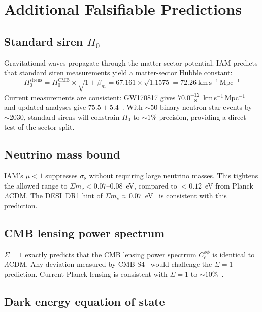 \documentclass[12pt,a4paper]{article}
\begin{document}
\section{Additional Falsifiable Predictions}

\subsection{Standard siren $H_0$}

Gravitational waves propagate through the matter-sector potential. IAM predicts
that standard siren measurements yield a matter-sector Hubble constant:
\begin{equation}
H_0^\mathrm{sirens} = H_0^\mathrm{CMB} \times \sqrt{1 + \beta_m}
= 67.161 \times \sqrt{1.1575} = 72.26\ \mathrm{km\,s^{-1}\,Mpc^{-1}}
\end{equation}
Current measurements are consistent: GW170817 gives $70.0^{+12}_{-8}$~km\,s$^{-1}$\,Mpc$^{-1}$~\citep{Abbott2017} and updated analyses give $75.5 \pm 5.4$~\citep{Nicolaou2023}. With $\sim 50$ binary neutron star events by $\sim 2030$, standard sirens will constrain $H_0$ to $\sim 1\%$ precision, providing a direct test of the sector split.

\subsection{Neutrino mass bound}

IAM's $\mu < 1$ suppresses $\sigma_8$ without requiring large neutrino masses.
This tightens the allowed range to $\Sigma m_\nu < 0.07$--$0.08$~eV, compared
to $< 0.12$~eV from Planck $\Lambda$CDM. The DESI~DR1 hint of
$\Sigma m_\nu \approx 0.07$~eV~\citep{DESI2025} is consistent with this
prediction.

\subsection{CMB lensing power spectrum}

$\Sigma = 1$ exactly predicts that the CMB lensing power spectrum $C_\ell^{\phi\phi}$
is identical to $\Lambda$CDM. Any deviation measured by CMB-S4~\citep{CMBS4} would
challenge the $\Sigma = 1$ prediction. Current Planck lensing is consistent with
$\Sigma = 1$ to $\sim 10\%$~\citep{Planck2020lens}.

\subsection{Dark energy equation of state}
\end{document}
